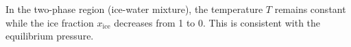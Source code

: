 In the two-phase region (ice-water mixture), the temperature \( T \) remains constant while the ice fraction \( x_{\text{ice}} \) decreases from 1 to 0. This is consistent with the equilibrium pressure.